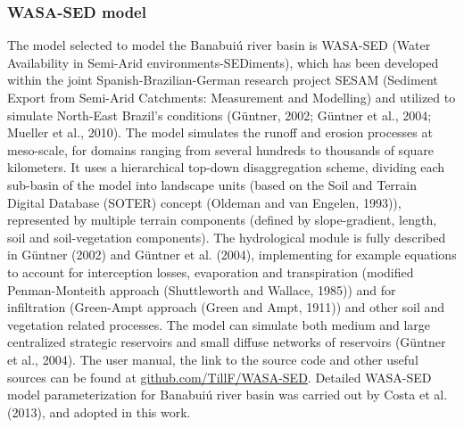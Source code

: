 \documentclass[draft]{agujournal2019}
\begin{document}
\subsubsection{WASA-SED model}
The model selected to model the Banabuiú river basin is WASA-SED (Water Availability in Semi-Arid environments-SEDiments), which has been developed within the joint Spanish-Brazilian-German research project SESAM (Sediment Export from Semi-Arid Catchments: Measurement and Modelling) and utilized to simulate North-East Brazil’s conditions (Güntner, 2002; Güntner et al., 2004; Mueller et al., 2010). The model simulates the runoff and erosion processes at meso-scale, for domains ranging from several hundreds to thousands of square kilometers. It uses a hierarchical top-down disaggregation scheme, dividing each sub-basin of the model into landscape units (based on the Soil and Terrain Digital Database (SOTER) concept (Oldeman and van Engelen, 1993)), represented by multiple terrain components (defined by slope-gradient, length, soil and soil-vegetation components). The hydrological module is fully described in Güntner (2002) and Güntner et al. (2004), implementing for example equations to account for interception losses, evaporation and transpiration (modified Penman-Monteith approach (Shuttleworth and Wallace, 1985)) and for infiltration (Green-Ampt approach (Green and Ampt, 1911)) and other soil and vegetation related processes. The model can simulate both medium and large  centralized strategic reservoirs and small diffuse networks of reservoirs (Güntner et al., 2004). The user manual, the link to the source code and other useful sources can be found at \url{github.com/TillF/WASA-SED}. Detailed WASA-SED model parameterization for Banabuiú river basin was carried out by Costa et al. (2013), and adopted in this work.
\end{document}
